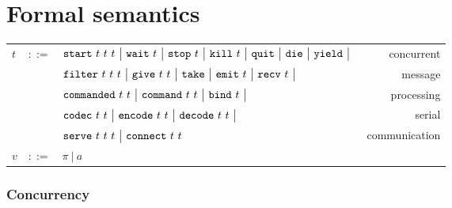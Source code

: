 %

\chapter{Formal semantics}

\newcommand\newId[2]{\newcommand{#1}{\ensuremath{{\tt #2}}}}

\newenvironment{Grammar}
{
  \begin{tabular*}{\linewidth}{
    >{$}l<{$}
    >{$}c<{$}
    >{$}l<{$}
    @{\extracolsep{\fill}}
    r}
}{
  \end{tabular*}
}

\newcommand\OR{\ensuremath{~\big|~}}

\newId{\Start}{start}
\newId{\Wait}{wait}
\newId{\Stop}{stop}
\newId{\Kill}{kill}
\newId{\Quit}{quit}
\newId{\Die}{die}
\newId{\Yield}{yield}
\newId{\Filter}{filter}
\newId{\Give}{give}
\newId{\Take}{take}
\newId{\Emit}{emit}
\newId{\Recv}{recv}
\newId{\Commanded}{commanded}
\newId{\Command}{command}
\newId{\Bind}{bind}
\newId{\Codec}{codec}
\newId{\Encode}{encode}
\newId{\Decode}{decode}
\newId{\Serve}{serve}
\newId{\Connect}{connect}

\begin{center}
  \begin{Grammar}
    t
    &::=& \Start~t~t~t \OR \Wait~t \OR \Stop~t \OR \Kill~t \OR \Quit \OR \Die \OR \Yield \OR & concurrent \\
    &   & \Filter~t~t~t \OR \Give~t~t \OR \Take \OR \Emit~t \OR \Recv~t \OR & message \\
    &   & \Commanded~t~t \OR \Command~t~t \OR \Bind~t \OR & processing \\
    &   & \Codec~t~t \OR \Encode~t~t \OR \Decode~t~t \OR & serial \\
    &   & \Serve~t~t~t \OR \Connect~t~t & communication \\[1ex]
    v
    &::=& \pi \OR a \\
  \end{Grammar}
\end{center}

\subsection*{Concurrency}


